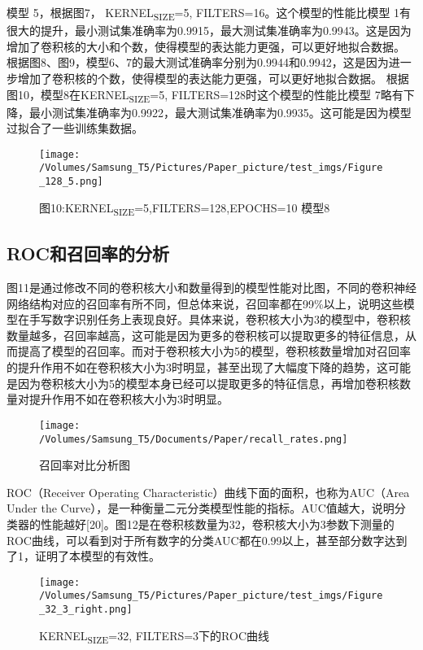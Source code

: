 \documentclass[11pt]{article}
\begin{document}
模型 5，根据图7， KERNEL\textsubscript{SIZE}=5, FILTERS=16。这个模型的性能比模型 1有很大的提升，最小测试集准确率为0.9915，最大测试集准确率为0.9943。这是因为增加了卷积核的大小和个数，使得模型的表达能力更强，可以更好地拟合数据。
根据图8、图9，模型6、7的最大测试准确率分别为0.9944和0.9942，这是因为进一步增加了卷积核的个数，使得模型的表达能力更强，可以更好地拟合数据。
根据图10，模型8在KERNEL\textsubscript{SIZE}=5, FILTERS=128时这个模型的性能比模型 7略有下降，最小测试集准确率为0.9922，最大测试集准确率为0.9935。这可能是因为模型过拟合了一些训练集数据。
\begin{figure}[htbp]
\centering
\texttt{[image: /Volumes/Samsung\_T5/Pictures/Paper\_picture/test\_imgs/Figure\_128\_5.png]}
\caption{图10:KERNEL\textsubscript{SIZE}=5,FILTERS=128,EPOCHS=10 模型8}
\end{figure}

\subsection{ROC和召回率的分析}
\label{sec:org983b222}

图11是通过修改不同的卷积核大小和数量得到的模型性能对比图，不同的卷积神经网络结构对应的召回率有所不同，但总体来说，召回率都在99\%以上，说明这些模型在手写数字识别任务上表现良好。具体来说，卷积核大小为3的模型中，卷积核数量越多，召回率越高，这可能是因为更多的卷积核可以提取更多的特征信息，从而提高了模型的召回率。而对于卷积核大小为5的模型，卷积核数量增加对召回率的提升作用不如在卷积核大小为3时明显，甚至出现了大幅度下降的趋势，这可能是因为卷积核大小为5的模型本身已经可以提取更多的特征信息，再增加卷积核数量对提升作用不如在卷积核大小为3时明显。
\begin{figure}[htbp]
\centering
\texttt{[image: /Volumes/Samsung\_T5/Documents/Paper/recall\_rates.png]}
\caption{召回率对比分析图}
\end{figure}


ROC（Receiver Operating Characteristic）曲线下面的面积，也称为AUC（Area Under the Curve），是一种衡量二元分类模型性能的指标。AUC值越大，说明分类器的性能越好[20]。图12是在卷积核数量为32，卷积核大小为3参数下测量的ROC曲线，可以看到对于所有数字的分类AUC都在0.99以上，甚至部分数字达到了1，证明了本模型的有效性。
\begin{figure}[htbp]
\centering
\texttt{[image: /Volumes/Samsung\_T5/Pictures/Paper\_picture/test\_imgs/Figure\_32\_3\_right.png]}
\caption{KERNEL\textsubscript{SIZE}=32, FILTERS=3下的ROC曲线}
\end{figure}
\end{document}
